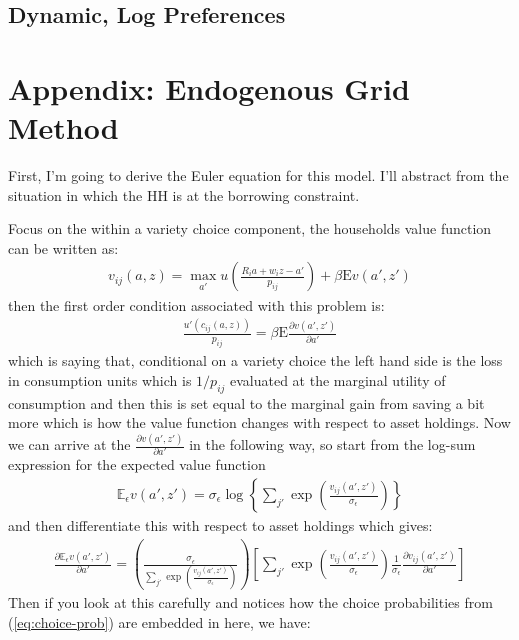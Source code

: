 \documentclass[12pt,pdftex]{article}
\begin{document}
\begin{onehalfspacing}
\subsection{Dynamic, Log Preferences}


\newpage


\section{Appendix: Endogenous Grid Method}

First, I'm going to derive the Euler equation for this model. I'll abstract from the situation in which the HH is at the borrowing constraint.

Focus on the within a variety choice component, the households value function can be written as:
\begin{align}
v_{ij}(a, z) = \max_{a'} u \left( \frac{R_i a + w_i z - a'}{p_{ij}} \right) + \beta  \mathrm{E} v(a', z')
\end{align}
then the first order condition associated with this problem is:
\begin{align}
\frac{u'(c_{ij}(a, z))}{p_{ij}} = \beta \mathrm{E} \frac{\partial v(a', z')}{\partial a'}
\end{align}
which is saying that, conditional on a variety choice the left hand side is the loss in consumption units which is $1 / p_{ij}$ evaluated at the marginal utility of consumption and then this is set equal to the marginal gain from saving a bit more which is how the value function changes with respect to asset holdings. Now we can arrive at the $\frac{\partial v(a', z')}{\partial a'}$ in the following way, so start from the log-sum expression for the expected value function
\begin{align}
\mathbb{E}_{\epsilon} v(a', z') =  \sigma_{\epsilon} \log \left\{ \sum_{j'} \exp \left( \frac{  v_{ij}(a', z')}{\sigma_{\epsilon}} \right) \right\}
\end{align}
and then differentiate this with respect to asset holdings which gives:
\begin{align}
\frac{\partial \mathbb{E}_{\epsilon} v(a', z')}{\partial a'} = \left( \frac{\sigma_{\epsilon}}{\sum_{j'} \exp \left( \frac{  v_{ij}(a', z')}{\sigma_{\epsilon}}\right)} \right)
\left[ \sum_{j'} \exp \left( \frac{  v_{ij}(a', z')}{\sigma_{\epsilon}}\right) \frac{1}{\sigma_{\epsilon}} \frac{\partial v_{ij}(a', z')}{\partial a'}  \right]
\end{align}
Then if you look at this carefully and notices how the choice probabilities from (\ref{eq:choice-prob}) are embedded in here, we have:

\end{onehalfspacing}
\end{document}
